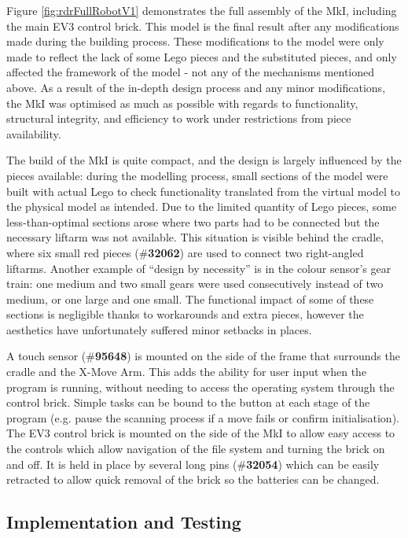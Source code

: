 \documentclass{report}
\newcommand{\tbo}[1]{\textbf{#1}}
\newcommand{\legopiece}[1]{(\#\tbo{#1})}
\begin{document}
	Figure \ref{fig:rdrFullRobotV1} demonstrates the full assembly of the MkI, including the main EV3 control brick. This model is the final result after any modifications made during the building process. These modifications to the model were only made to reflect the lack of some Lego pieces and the substituted pieces, and only affected the framework of the model - not any of the mechanisms mentioned above. As a result of the in-depth design process and any minor modifications, the MkI was optimised as much as possible with regards to functionality, structural integrity, and efficiency to work under restrictions from piece availability.
	
	The build of the MkI is quite compact, and the design is largely influenced by the pieces available: during the modelling process, small sections of the model were built with actual Lego to check functionality translated from the virtual model to the physical model as intended. Due to the limited quantity of Lego pieces, some less-than-optimal sections arose where two parts had to be connected but the necessary liftarm was not available. This situation is visible behind the cradle, where six small red pieces \legopiece{32062} are used to connect two right-angled liftarms. Another example of \enquote{design by necessity} is in the colour sensor's gear train: one medium and two small gears were used consecutively instead of two medium, or one large and one small. The functional impact of some of these sections is negligible thanks to workarounds and extra pieces, however the aesthetics have unfortunately suffered minor setbacks in places.
	
	A touch sensor \legopiece{95648} is mounted on the side of the frame that surrounds the cradle and the X-Move Arm. This adds the ability for user input when the program is running, without needing to access the operating system through the control brick. Simple tasks can be bound to the button at each stage of the program (e.g. pause the scanning process if a move fails or confirm initialisation). The EV3 control brick is mounted on the side of the MkI to allow easy access to the controls which allow navigation of the file system and turning the brick on and off. It is held in place by several long pins \legopiece{32054} which can be easily retracted to allow quick removal of the brick so the batteries can be changed.

	\subsection{Implementation and Testing}
	
\end{document}
